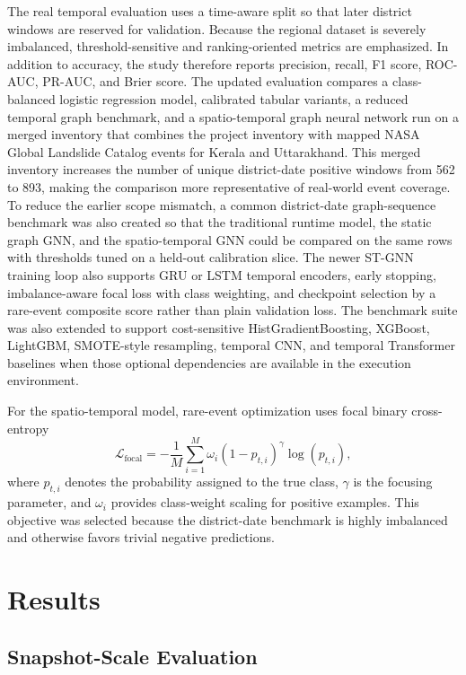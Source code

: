 \documentclass[pdflatex,sn-mathphys-num]{sn-jnl}
\begin{document}
The real temporal evaluation uses a time-aware split so that later district windows are reserved for validation. Because the regional dataset is severely imbalanced, threshold-sensitive and ranking-oriented metrics are emphasized. In addition to accuracy, the study therefore reports precision, recall, F1 score, ROC-AUC, PR-AUC, and Brier score. The updated evaluation compares a class-balanced logistic regression model, calibrated tabular variants, a reduced temporal graph benchmark, and a spatio-temporal graph neural network run on a merged inventory that combines the project inventory with mapped NASA Global Landslide Catalog events for Kerala and Uttarakhand. This merged inventory increases the number of unique district-date positive windows from 562 to 893, making the comparison more representative of real-world event coverage. To reduce the earlier scope mismatch, a common district-date graph-sequence benchmark was also created so that the traditional runtime model, the static graph GNN, and the spatio-temporal GNN could be compared on the same rows with thresholds tuned on a held-out calibration slice. The newer ST-GNN training loop also supports GRU or LSTM temporal encoders, early stopping, imbalance-aware focal loss with class weighting, and checkpoint selection by a rare-event composite score rather than plain validation loss. The benchmark suite was also extended to support cost-sensitive HistGradientBoosting, XGBoost, LightGBM, SMOTE-style resampling, temporal CNN, and temporal Transformer baselines when those optional dependencies are available in the execution environment.

For the spatio-temporal model, rare-event optimization uses focal binary cross-entropy
\begin{equation}
\mathcal{L}_{\mathrm{focal}} = - \frac{1}{M}\sum_{i=1}^{M}
\omega_i (1-p_{t,i})^{\gamma}\log(p_{t,i}),
\label{eq:focal_loss}
\end{equation}
where $p_{t,i}$ denotes the probability assigned to the true class, $\gamma$ is the focusing parameter, and $\omega_i$ provides class-weight scaling for positive examples. This objective was selected because the district-date benchmark is highly imbalanced and otherwise favors trivial negative predictions.

\section{Results}

\subsection{Snapshot-Scale Evaluation}
\end{document}
